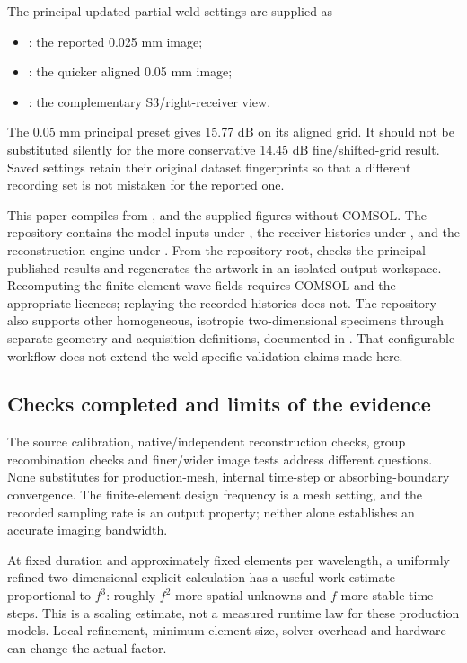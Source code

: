 \documentclass[11pt]{article}
\begin{document}
The principal updated partial-weld settings are supplied as
\begin{itemize}\raggedright
\item {}: the reported 0.025 mm image;
\item {}: the quicker aligned 0.05 mm image;
\item {}: the complementary S3/right-receiver view.
\end{itemize}
The 0.05 mm principal preset gives 15.77 dB on its aligned grid. It should not be substituted silently for the more conservative 14.45 dB fine/shifted-grid result. Saved settings retain their original dataset fingerprints so that a different recording set is not mistaken for the reported one.

This paper compiles from ,  and the supplied figures without COMSOL. The repository contains the model inputs under , the receiver histories under , and the reconstruction engine under . From the repository root,  checks the principal published results and  regenerates the artwork in an isolated output workspace. Recomputing the finite-element wave fields requires COMSOL and the appropriate licences; replaying the recorded histories does not. The repository also supports other homogeneous, isotropic two-dimensional specimens through separate geometry and acquisition definitions, documented in . That configurable workflow does not extend the weld-specific validation claims made here.

\subsection{Checks completed and limits of the evidence}
The source calibration, native/independent reconstruction checks, group recombination checks and finer/wider image tests address different questions. None substitutes for production-mesh, internal time-step or absorbing-boundary convergence. The finite-element design frequency is a mesh setting, and the recorded sampling rate is an output property; neither alone establishes an accurate imaging bandwidth.

At fixed duration and approximately fixed elements per wavelength, a uniformly refined two-dimensional explicit calculation has a useful work estimate proportional to $f^3$: roughly $f^2$ more spatial unknowns and $f$ more stable time steps. This is a scaling estimate, not a measured runtime law for these production models. Local refinement, minimum element size, solver overhead and hardware can change the actual factor.
\end{document}
